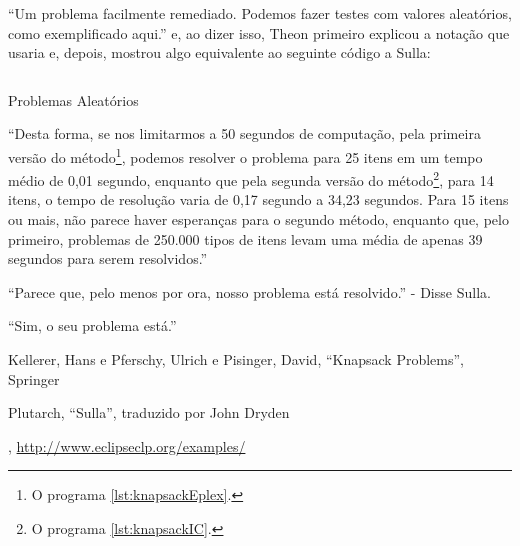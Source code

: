 \documentclass{article}
\begin{document}
  ``Um problema facilmente remediado. Podemos fazer testes com valores aleatórios, como exemplificado aqui.'' e, ao dizer isso, Theon
  primeiro explicou a notação que usaria e, depois, mostrou algo equivalente ao seguinte código a Sulla:

  \begin{listing}[H]
    \inputminted{prolog}{../Exemplos/Cap12/test/random.ecl}
    \caption{Problemas Aleatórios}\label{lst:random}
  \end{listing}

  ``Desta forma, se nos limitarmos a 50 segundos de computação, pela primeira versão do
  método\footnote{O programa \ref{lst:knapsackEplex}.}, podemos resolver o problema para 25 itens em
  um tempo médio de 0,01 segundo, enquanto que pela segunda versão do método\footnote{O programa
    \ref{lst:knapsackIC}.}, para 14 itens,  o tempo de resolução varia de 0,17 segundo a 34,23 segundos. Para 15 itens ou mais, não parece haver esperanças para o segundo método, enquanto que, pelo primeiro, problemas de 250.000 tipos de itens levam uma média de apenas 39 segundos para serem resolvidos.''

  ``Parece que, pelo menos por ora, nosso problema está resolvido.'' - Disse Sulla.

  ``Sim, o seu problema está.''











  \begin{thebibliography}{2}

    Kellerer, Hans e Pferschy, Ulrich e Pisinger, David,
    ``Knapsack Problems'', Springer

    Plutarch,
    ``Sulla'', traduzido por John Dryden

    \eclipse,
    \url{http://www.eclipseclp.org/examples/}

  \end{thebibliography}
\end{document}
